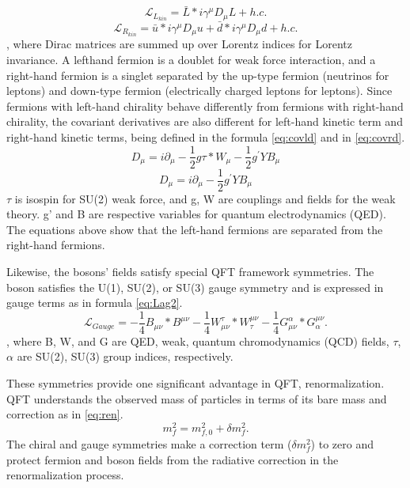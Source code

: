 \begin{equation}
\label{eq:Lag1}
	\mathcal{L}_{L_{kin}}  = \bar{L}*i\gamma^{\mu}D_{\mu}L+h.c.
\end{equation}
\begin{equation}
\label{eq:Lagr1}
	\mathcal{L}_{R_{kin}}  = \bar{u}*i\gamma^{\mu}D_{\mu}u+\bar{d}*i\gamma^{\mu}D_{\mu}d+h.c.
\end{equation}
, where Dirac matrices are summed up over Lorentz indices for Lorentz invariance. A lefthand fermion is a doublet for weak force interaction, and a right-hand fermion is a singlet separated by the up-type fermion (neutrinos for leptons) and down-type fermion (electrically charged leptons for leptons).
Since fermions with left-hand chirality behave differently from fermions with right-hand chirality,
the covariant derivatives are also different for left-hand kinetic term and right-hand kinetic terms, being defined in the formula \ref{eq:covld} and in \ref{eq:covrd}.
\begin{equation}
\label{eq:covld}
	D_{\mu}  = i\partial_{\mu}-\frac{1}{2}g\tau*W_{\mu}-\frac{1}{2}g^{'}YB_{\mu} 
\end{equation}
\begin{equation}
\label{eq:covrd}
	D_{\mu}  = i\partial_{\mu}-\frac{1}{2}g^{'}YB_{\mu} 
\end{equation}
$\tau$ is isospin for SU(2) weak force, and g, W are couplings and fields for the weak theory. g' and B are respective variables for quantum electrodynamics (QED).
The equations above show that the left-hand fermions are separated from the right-hand fermions.


Likewise, the bosons' fields satisfy special QFT framework symmetries.
The boson satisfies the U(1), SU(2), or SU(3) gauge symmetry and is expressed in gauge terms as in formula \ref{eq:Lag2}.
\begin{equation}
\label{eq:Lag2}
	\mathcal{L}_{Gauge} = -\frac{1}{4}B_{\mu\nu}*B^{\mu\nu}-\frac{1}{4}W_{\mu\nu}^{\tau}*W^{\mu\nu}_{\tau}-\frac{1}{4}G_{\mu\nu}^{\alpha}*G^{\mu\nu}_{\alpha}.
\end{equation}
, where B, W, and G are QED, weak, quantum chromodynamics (QCD) fields, $\tau$, $\alpha$ are SU(2), SU(3) group indices, respectively.

These symmetries provide one significant advantage in QFT, renormalization.
QFT understands the observed mass of particles in terms of its bare mass and correction as in \ref{eq:ren}.
\begin{equation}
\label{eq:ren}
	m_{f}^{2}=m_{f,0}^{2}+\delta m_{f}^2.
\end{equation}
The chiral and gauge symmetries make a correction term ($\delta m_{f}^2$) to zero and protect fermion and boson fields from the radiative correction in the renormalization process.

